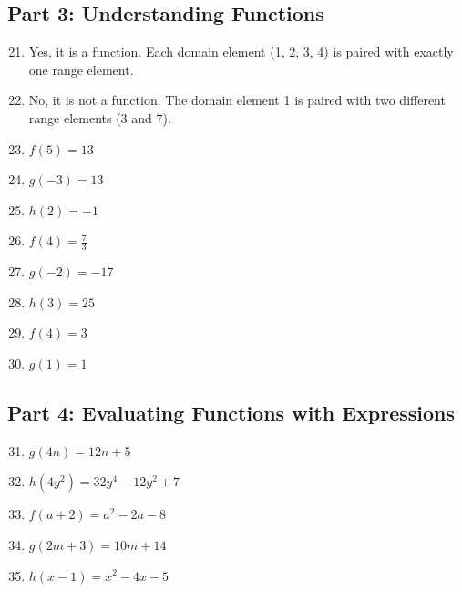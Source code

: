 \documentclass[12pt]{article}
\begin{document}
\subsection*{Part 3: Understanding Functions}

\begin{enumerate}
\setcounter{enumi}{20}

\item Yes, it is a function. Each domain element (1, 2, 3, 4) is paired with exactly one range element.

\item No, it is not a function. The domain element 1 is paired with two different range elements (3 and 7).

\item $f(5) = 13$

\item $g(-3) = 13$

\item $h(2) = -1$

\item $f(4) = \frac{7}{3}$

\item $g(-2) = -17$

\item $h(3) = 25$

\item $f(4) = 3$

\item $g(1) = 1$

\end{enumerate}

\subsection*{Part 4: Evaluating Functions with Expressions}

\begin{enumerate}
\setcounter{enumi}{30}

\item $g(4n) = 12n + 5$

\item $h(4y^2) = 32y^4 - 12y^2 + 7$

\item $f(a+2) = a^2 - 2a - 8$

\item $g(2m+3) = 10m + 14$

\item $h(x-1) = x^2 - 4x - 5$

\end{enumerate}
\end{document}
